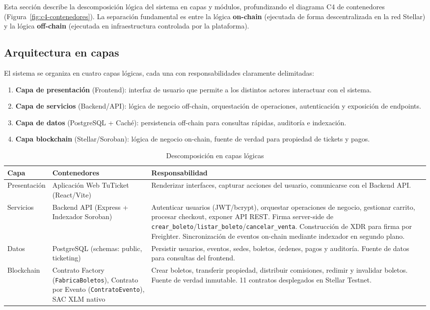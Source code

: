 \documentclass[12pt,oneside]{article}
\begin{document}
Esta sección describe la descomposición lógica del sistema en capas y módulos, profundizando el diagrama C4 de contenedores (Figura~\ref{fig:c4-contenedores}). La separación fundamental es entre la lógica \textbf{on-chain} (ejecutada de forma descentralizada en la red Stellar) y la lógica \textbf{off-chain} (ejecutada en infraestructura controlada por la plataforma).

\subsection{Arquitectura en capas}

El sistema se organiza en cuatro capas lógicas, cada una con responsabilidades claramente delimitadas:

\begin{enumerate}
  \item \textbf{Capa de presentación} (Frontend): interfaz de usuario que permite a los distintos actores interactuar con el sistema.
  \item \textbf{Capa de servicios} (Backend/API): lógica de negocio off-chain, orquestación de operaciones, autenticación y exposición de endpoints.
  \item \textbf{Capa de datos} (PostgreSQL + Caché): persistencia off-chain para consultas rápidas, auditoría e indexación.
  \item \textbf{Capa blockchain} (Stellar/Soroban): lógica de negocio on-chain, fuente de verdad para propiedad de tickets y pagos.
\end{enumerate}

\begin{table}[htbp]
  \centering
  \begin{tabularx}{\textwidth}{@{}p{3cm} p{4cm} X@{}}
    \toprule
    \textbf{Capa} & \textbf{Contenedores} & \textbf{Responsabilidad}\\
    \midrule
    Presentación & Aplicación Web TuTicket (React/Vite) & Renderizar interfaces, capturar acciones del usuario, comunicarse con el Backend API.\\
    Servicios & Backend API (Express + Indexador Soroban) & Autenticar usuarios (JWT/bcrypt), orquestar operaciones de negocio, gestionar carrito, procesar checkout, exponer API REST. Firma server-side de \texttt{crear\_boleto}/\texttt{listar\_boleto}/\texttt{cancelar\_venta}. Construcción de XDR para firma por Freighter. Sincronización de eventos on-chain mediante indexador en segundo plano.\\
    Datos & PostgreSQL (schemas: public, ticketing) & Persistir usuarios, eventos, sedes, boletos, órdenes, pagos y auditoría. Fuente de datos para consultas del frontend.\\
    Blockchain & Contrato Factory (\texttt{FabricaBoletos}), Contrato por Evento (\texttt{ContratoEvento}), SAC XLM nativo & Crear boletos, transferir propiedad, distribuir comisiones, redimir y invalidar boletos. Fuente de verdad inmutable. 11 contratos desplegados en Stellar Testnet.\\
    \bottomrule
  \end{tabularx}
  \caption{Descomposición en capas lógicas}
  \label{tab:capas}
\end{table}
\end{document}
